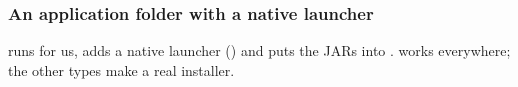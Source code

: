 \documentclass[aspectratio=169,10pt,compress]{beamer}
\begin{document}




\begin{frame}[t,fragile] \frametitle{An application folder with a native launcher}

  \vspace{0.1em}
  \small
   runs  for us, adds a native launcher () and puts the JARs into .
   works everywhere; the other types make a real installer.
\end{frame}
\end{document}
